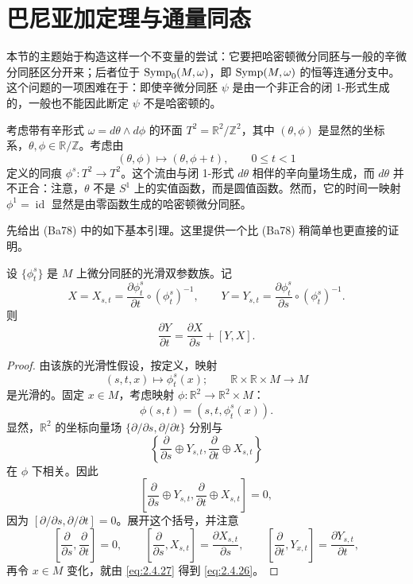 \section{巴尼亚加定理与通量同态}
\label{sec:banyaga-flux}

本节的主题始于构造这样一个不变量的尝试：它要把哈密顿微分同胚与一般的辛微分同胚区分开来；后者位于 $\operatorname{Symp}_0(M,\omega)$，即 $\operatorname{Symp}(M,\omega)$ 的恒等连通分支中。这个问题的一项困难在于：即使辛微分同胚 $\psi$ 是由一个非正合的闭 1-形式生成的，一般也不能因此断定 $\psi$ 不是哈密顿的。

\begin{example}
\label{ex:torus-nonexact-loop}
考虑带有辛形式 $\omega=d\theta\wedge d\phi$ 的环面
$T^2=\mathbb R^2/\mathbb Z^2$，其中 $(\theta,\phi)$ 是显然的坐标系，$\theta,\phi\in\mathbb R/\mathbb Z$。考虑由
\[
  (\theta,\phi)\longmapsto(\theta,\phi+t),
  \qquad 0\le t<1
\]
定义的同痕 $\phi^s:T^2\to T^2$。这个流由与闭 1-形式 $d\theta$ 相伴的辛向量场生成，而 $d\theta$ 并不正合：注意，$\theta$ 不是 $S^1$ 上的实值函数，而是圆值函数。然而，它的时间一映射 $\phi^1=\operatorname{id}$ 显然是由零函数生成的哈密顿微分同胚。
\end{example}

先给出 (Ba78) 中的如下基本引理。这里提供一个比 (Ba78) 稍简单也更直接的证明。

\begin{lemma}[巴尼亚加]
\label{lem:banyaga-two-parameter}
设 $\{\phi_t^s\}$ 是 $M$ 上微分同胚的光滑双参数族。记
\[
 X=X_{s,t}=\frac{\partial\phi_t^s}{\partial t}\circ(\phi_t^s)^{-1},
 \qquad
 Y=Y_{s,t}=\frac{\partial\phi_t^s}{\partial s}\circ(\phi_t^s)^{-1}.
\]
则
\begin{equation}
  \frac{\partial Y}{\partial t}
  =\frac{\partial X}{\partial s}+[Y,X].
  \label{eq:2.4.26}
\end{equation}
\end{lemma}

\begin{proof}
由该族的光滑性假设，按定义，映射
\[
  (s,t,x)\longmapsto\phi_t^s(x);
  \qquad\mathbb R\times\mathbb R\times M\longrightarrow M
\]
是光滑的。固定 $x\in M$，考虑映射 $\phi:\mathbb R^2\to\mathbb R^2\times M$：
\[
  \phi(s,t)=(s,t,\phi_t^s(x)).
\]
显然，$\mathbb R^2$ 的坐标向量场 $\{\partial/\partial s,\partial/\partial t\}$ 分别与
\[
  \left\{\frac\partial{\partial s}\oplus Y_{s,t},
  \frac\partial{\partial t}\oplus X_{s,t}\right\}
\]
在 $\phi$ 下相关。因此
\begin{equation}
 \left[
   \frac\partial{\partial s}\oplus Y_{s,t},
   \frac\partial{\partial t}\oplus X_{s,t}
 \right]=0,
 \label{eq:2.4.27}
\end{equation}
因为 $[\partial/\partial s,\partial/\partial t]=0$。展开这个括号，并注意
\[
 \left[\frac\partial{\partial s},\frac\partial{\partial t}\right]=0,
 \qquad
 \left[\frac\partial{\partial s},X_{s,t}\right]
   =\frac{\partial X_{s,t}}{\partial s},
 \qquad
 \left[\frac\partial{\partial t},Y_{x,t}\right]
   =\frac{\partial Y_{s,t}}{\partial t},
\]
再令 $x\in M$ 变化，就由 \eqref{eq:2.4.27} 得到 \eqref{eq:2.4.26}。
\end{proof}


